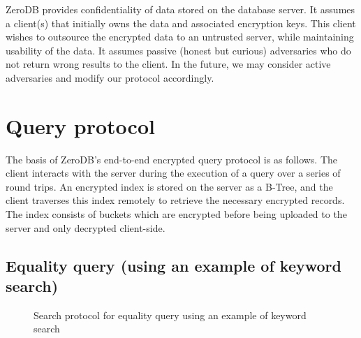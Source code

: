 \documentclass[notitlepage,longbibliography]{revtex4-1}
\begin{document}
ZeroDB provides confidentiality of data stored on the database server.
It assumes a client(s) that initially owns the data and associated encryption keys.
This client wishes to outsource the encrypted data to an untrusted server, while maintaining usability of the data.
It assumes passive (honest but curious) adversaries who do not return wrong results to the client.
In the future, we may consider active adversaries and modify our protocol accordingly.



\section{Query protocol}

The basis of ZeroDB's end-to-end encrypted query protocol is as follows.
The client interacts with the server during the execution of a query over a series of round trips.
An encrypted index is stored on the server as a B-Tree, and the client traverses this index remotely to retrieve the necessary encrypted records.
The index consists of buckets which are encrypted before being uploaded to the server and only decrypted client-side.

\subsection{Equality query (using an example of keyword search)}
\begin{figure}
	\begin{center}
        \qquad
	\end{center}
    \caption{Search protocol for equality query using an example of keyword search}
	\label{fig:btree-protocol}
\end{figure}
\end{document}

